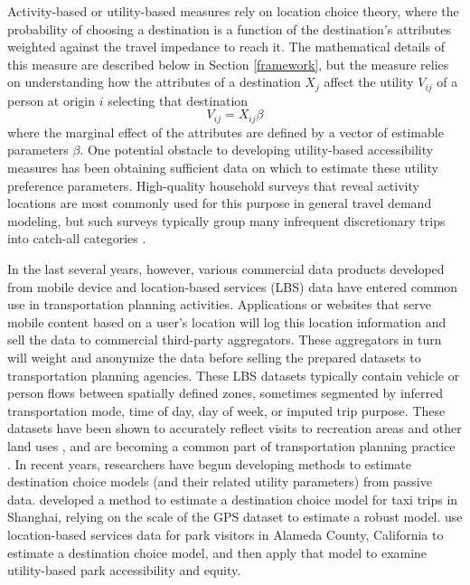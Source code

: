 \documentclass[ijerph,article,submit,moreauthors,pdftex]{mdpi}
\begin{document}
Activity-based or utility-based measures rely on location choice theory, where
the probability of choosing a destination is a function of the destination's
attributes weighted against the travel impedance to reach it. The mathematical
details of this measure are described below in Section \ref{framework}, but the
measure relies on understanding how the attributes of a destination \(X_j\) affect
the utility \(V_{ij}\) of a person at origin \(i\) selecting that destination
\begin{equation}
V_{ij} = X_{ij}\beta
  \label{eq:simple-utility}
\end{equation}
where the marginal effect of the attributes are defined by a vector of
estimable parameters \(\beta\).
One potential obstacle to developing utility-based accessibility measures has been
obtaining sufficient data on which to estimate these utility preference parameters.
High-quality household surveys that reveal activity locations are most commonly
used for this purpose in general travel demand modeling, but such surveys typically
group many infrequent discretionary trips into catch-all categories \citep{nchrp716}.

In the last several years, however, various commercial data products developed from
mobile device and location-based services (LBS) data have entered common use in
transportation planning activities. Applications or websites that serve mobile
content based on a user's location will log this location information and
sell the data to commercial third-party aggregators. These aggregators in turn will weight
and anonymize the data before selling the prepared datasets to transportation
planning agencies. These LBS datasets typically contain
vehicle or person flows between spatially defined zones, sometimes segmented by
inferred transportation mode, time of day, day of week, or imputed trip purpose.
These datasets have been shown to accurately reflect visits to recreation areas
and other land uses \citep{monz2019}, and are becoming a common part of transportation
planning practice \citep{naboulsi2016, tcrp138}. In recent years, researchers have
begun developing methods to estimate destination choice models (and their
related utility parameters) from passive data. \citet{zhu2018} developed a method to
estimate a destination choice model for taxi trips in Shanghai, relying on the
scale of the GPS dataset to estimate a robust model. \citet{alamedaparks} use
location-based services data for park visitors in Alameda County, California to
estimate a destination choice model, and then apply that model to examine
utility-based park accessibility and equity.
\end{document}
